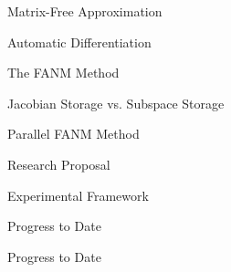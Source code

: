 \documentclass{beamer}
\begin{document}
\begin{frame}{Matrix-Free Approximation}

\end{frame}

\begin{frame}{Automatic Differentiation}

\end{frame}

\begin{frame}{The FANM Method}

\end{frame}

\begin{frame}{Jacobian Storage vs. Subspace Storage}

\end{frame}

\begin{frame}{Parallel FANM Method}

\end{frame}

\begin{frame}{Research Proposal}

\end{frame}

\begin{frame}{Experimental Framework}

\end{frame}

\begin{frame}{Progress to Date}

\end{frame}

\begin{frame}{Progress to Date}

\end{frame}
\end{document}
